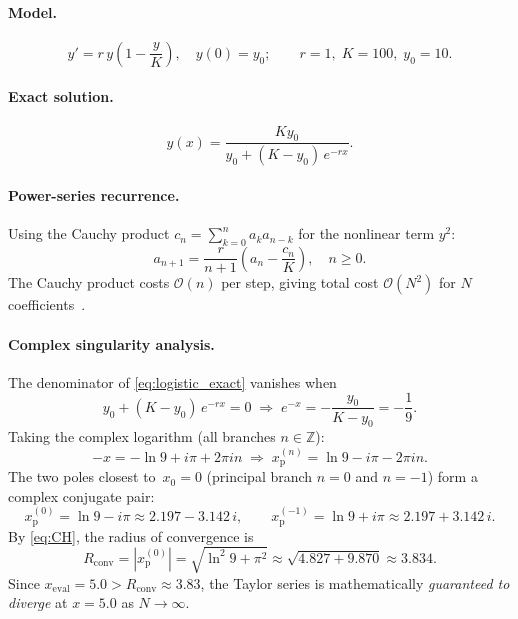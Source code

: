 \documentclass[12pt,a4paper]{article}
\theoremstyle{definition}
\theoremstyle{remark}
\newcommand{\Rconv}{R_{\mathrm{conv}}}
\newcommand{\xp}{x_{\mathrm{p}}}
\newcommand{\OO}{\mathcal{O}}
\newcommand{\abs}[1]{\left\lvert #1 \right\rvert}
\begin{document}
\paragraph{Model.}
\begin{equation}
  y' = r\,y\!\left(1 - \frac{y}{K}\right), \quad y(0) = y_0;
  \qquad r = 1,\; K = 100,\; y_0 = 10.
  \label{eq:logistic}
\end{equation}

\paragraph{Exact solution.}
\begin{equation}
  y(x) = \frac{K y_0}{y_0 + (K - y_0)\,e^{-rx}}.
  \label{eq:logistic_exact}
\end{equation}

\paragraph{Power-series recurrence.}
Using the Cauchy product $c_n = \sum_{k=0}^{n} a_k a_{n-k}$ for the
nonlinear term $y^2$:
\begin{equation}
  a_{n+1} = \frac{r}{n+1}\!\left(a_n - \frac{c_n}{K}\right),
  \quad n \geq 0.
  \label{eq:logistic_rec}
\end{equation}
The Cauchy product costs $\OO(n)$ per step, giving total cost
$\OO(N^2)$ for $N$ coefficients~\cite{corliss1982}.

\paragraph{Complex singularity analysis.}
The denominator of \eqref{eq:logistic_exact} vanishes when
\begin{equation}
  y_0 + (K - y_0)\,e^{-rx} = 0
  \;\Longrightarrow\;
  e^{-x} = -\frac{y_0}{K - y_0} = -\frac{1}{9}.
  \label{eq:denom}
\end{equation}
Taking the complex logarithm (all branches $n \in \mathbb{Z}$):
\begin{equation}
  -x = -\ln 9 + i\pi + 2\pi i n
  \;\Longrightarrow\;
  \xp^{(n)} = \ln 9 - i\pi - 2\pi i n.
  \label{eq:poles_all}
\end{equation}
The two poles closest to~$x_0 = 0$ (principal branch $n = 0$ and
$n = -1$) form a complex conjugate pair:
\begin{equation}
  \xp^{(0)} = \ln 9 - i\pi \approx 2.197 - 3.142\,i,
  \qquad
  \xp^{(-1)} = \ln 9 + i\pi \approx 2.197 + 3.142\,i.
  \label{eq:poles}
\end{equation}
By \eqref{eq:CH}, the radius of convergence is
\begin{equation}
  \boxed{\Rconv = \abs{\xp^{(0)}}
    = \sqrt{\ln^2 9 + \pi^2}
    \approx \sqrt{4.827 + 9.870}
    \approx 3.834.}
  \label{eq:R}
\end{equation}
Since $x_{\mathrm{eval}} = 5.0 > \Rconv \approx 3.83$, the Taylor
series is mathematically \emph{guaranteed to diverge} at $x = 5.0$ as
$N \to \infty$.
\end{document}
